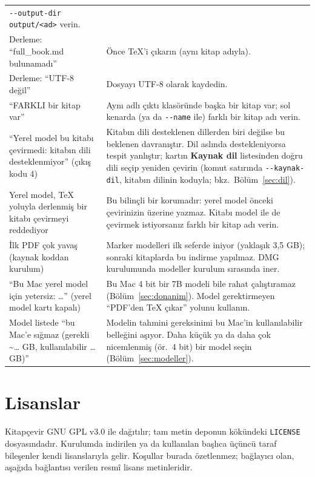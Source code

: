 \documentclass[11pt,a4paper]{article}
\newcommand{\dugme}[1]{\textsf{\bfseries #1}}
\newcommand{\dosya}[1]{\texttt{#1}}
\begin{document}
\begin{longtable}{@{}L{5.7cm}L{9.7cm}@{}}
\dosya{-{}-output-dir output/<ad>} verin. \\
Derleme: ``full\_book.md bulunamadı'' & Önce TeX'i çıkarın (aynı kitap
adıyla). \\
Derleme: ``UTF-8 değil'' & Dosyayı UTF-8 olarak kaydedin. \\
``FARKLI bir kitap var'' & Aynı adlı çıktı klasöründe başka bir kitap var;
sol kenarda (ya da \dosya{-{}-name} ile) farklı bir kitap adı verin. \\
``Yerel model bu kitabı çevirmedi: kitabın dili desteklenmiyor'' (çıkış
kodu 4) & Kitabın dili desteklenen dillerden biri değilse bu beklenen
davranıştır. Dil aslında destekleniyorsa tespit yanlıştır; kartın
\dugme{Kaynak dil} listesinden doğru dili seçip yeniden çevirin (komut
satırında \dosya{-{}-kaynak-dil}, kitabın dilinin koduyla; bkz.\
Bölüm~\ref{sec:dil}). \\
Yerel model, TeX yoluyla derlenmiş bir kitabı çevirmeyi reddediyor & Bu
bilinçli bir korumadır: yerel model önceki çevirinizin üzerine yazmaz.
Kitabı model ile de çevirmek istiyorsanız farklı bir kitap adı verin. \\
İlk PDF çok yavaş (kaynak koddan kurulum) & Marker modelleri ilk seferde
iniyor (yaklaşık 3,5 GB); sonraki kitaplarda bu indirme yapılmaz. DMG
kurulumunda modeller kurulum sırasında iner. \\
``Bu Mac yerel model için yetersiz: \ldots'' (yerel model kartı kapalı) & Bu
Mac 4 bit bir 7B modeli bile rahat çalıştıramaz
(Bölüm~\ref{sec:donanim}). Model gerektirmeyen ``PDF'den TeX çıkar'' yolunu
kullanın. \\
Model listede ``bu Mac'e sığmaz (gerekli \textasciitilde\ldots{} GB,
kullanılabilir \ldots{} GB)'' & Modelin tahmini gereksinimi bu Mac'in
kullanılabilir belleğini aşıyor. Daha küçük ya da daha çok nicemlenmiş
(ör.\ 4 bit) bir model seçin (Bölüm~\ref{sec:modeller}). \\
\bottomrule
\end{longtable}

\section{Lisanslar}\label{sec:lisans}
Kitapçevir GNU GPL v3.0 ile dağıtılır; tam metin deponun kökündeki
\dosya{LICENSE} dosyasındadır. Kurulumda indirilen ya da kullanılan başlıca
üçüncü taraf bileşenler kendi lisanslarıyla gelir. Koşullar burada
özetlenmez; bağlayıcı olan, aşağıda bağlantısı verilen resmî lisans
metinleridir.
\end{document}
